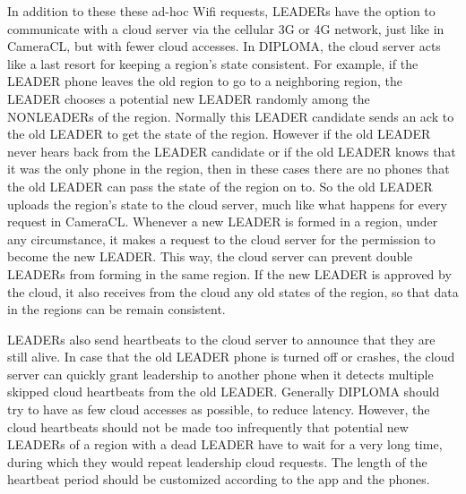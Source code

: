 In addition to these these ad-hoc Wifi requests, LEADERs have the option to communicate with a cloud server via the cellular 3G or 4G network, just like in CameraCL, but with fewer cloud accesses. In DIPLOMA, the cloud server acts like a last resort for keeping a region's state consistent. For example, if the LEADER phone leaves the old region to go to a neighboring region, the LEADER chooses a potential new LEADER randomly among the NONLEADERs of the region. Normally this LEADER candidate sends an ack to the old LEADER to get the state of the region. However if the old LEADER never hears back from the LEADER candidate or if the old LEADER knows that it was the only phone in the region, then in these cases there are no phones that the old LEADER can pass the state of the region on to. So the old LEADER uploads the region's state to the cloud server, much like what happens for every request in CameraCL. Whenever a new LEADER is formed in a region, under any circumstance, it makes a request to the cloud server for the permission to become the new LEADER. This way, the cloud server can prevent double LEADERs from forming in the same region. If the new LEADER is approved by the cloud, it also receives from the cloud any old states of the region, so that data in the regions can be remain consistent.

LEADERs also send heartbeats to the cloud server to announce that they are still alive. In case that the old LEADER phone is turned off or crashes, the cloud server can quickly grant leadership to another phone when it detects multiple skipped cloud heartbeats from the old LEADER. Generally DIPLOMA should try to have as few cloud accesses as possible, to reduce latency. However, the cloud heartbeats should not be made too infrequently that potential new LEADERs of a region with a dead LEADER have to wait for a very long time, during which they would repeat leadership cloud requests. The length of the heartbeat period should be customized according to the app and the phones.

